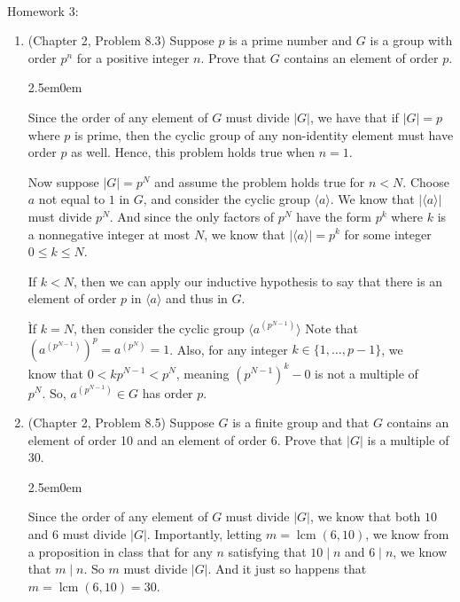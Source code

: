 \documentclass{book}
\newcommand{\exOne}{%
   \color{Purple}%
   \fontsize{13}{15}\selectfont%
}
\newenvironment{myIndent}{%
   \begin{adjustwidth}{2.5em}{0em}%
}{%
   \end{adjustwidth}%
}
\newcommand{\divides}{\mathop{\mid}}
\DeclareMathOperator{\lcm}{lcm}
\newcommand{\mySepTwo}[1][.]{%
   {\noindent\color{#1}{\rule{6.5in}{0.5mm}}}\\%
}
\newcommand{\retTwo}{\hfill\bigbreak}
\newcommand{\mHeader}[1]{{
   \color{Black}%
   \fontsize{20}{18}\selectfont%
   #1\retTwo
}}
\begin{document}
\mySepTwo

\mHeader{Homework 3:}


\begin{enumerate}
	\item (Chapter 2, Problem 8.3) Suppose $p$ is a prime number and $G$ is a group with order $p^n$ for a positive integer $n$. Prove that $G$ contains an element of order $p$.
	
	\begin{myIndent}\exOne
		Since the order of any element of $G$ must divide $|G|$, we have that if $|G| = p$ where $p$ is prime, then the cyclic group of any non-identity element must have order $p$ as well. Hence, this problem holds true when $n = 1$.\retTwo
		
		Now suppose $|G| = p^N$ and assume the problem holds true for $n < N$. Choose $a$ not equal to $1$ in $G$, and consider the cyclic group $\langle a \rangle$. We know that $|\langle a \rangle|$ must divide $p^N$. And since the only factors of $p^N$ have the form $p^k$ where $k$ is a nonnegative integer at most $N$, we know that $|\langle a \rangle| = p^k$ for some integer $0 \leq k \leq N$.\retTwo
		
		If $k < N$, then we can apply our inductive hypothesis to say that there is an element of order $p$ in $\langle a \rangle$ and thus in $G$.\retTwo

		Ìf $k = N$, then consider the cyclic group $\langle a^{(p^{N-1})} \rangle$ Note that\\ $(a^{(p^{N-1})})^p = a^{(p^N)} = 1$. Also, for any integer $k \in \{1, \ldots, p-1\}$, we\\ know that $0 < kp^{N-1} < p^N$, meaning $(p^{N-1})^k - 0$ is not a multiple of\\ $p^N$. So, $a^{(p^{N-1})} \in G$ has order $p$.\newpage
	\end{myIndent}

	\item (Chapter 2, Problem 8.5) Suppose $G$ is a finite group and that $G$ contains an element of order 10 and an element of order 6. Prove that $|G|$ is a multiple of $30$.
	
	\begin{myIndent}\exOne
		Since the order of any element of $G$ must divide $|G|$, we know that both $10$ and $6$ must divide $|G|$. Importantly, letting $m = \lcm(6, 10)$, we know from a proposition in class that for any $n$ satisfying that $10 \divides n$ and $6 \divides n$, we know that $m \divides n$. So $m$ must divide $|G|$. And it just so happens that $m = \lcm(6, 10) = 30$.
		\retTwo
	\end{myIndent}
	

\end{enumerate}
\end{document}

